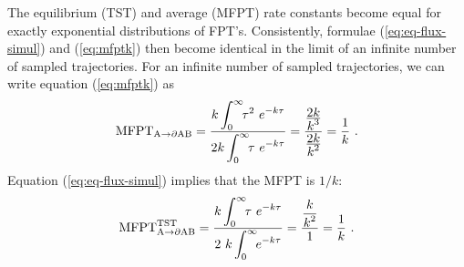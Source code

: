 The equilibrium (TST) and average (MFPT) rate constants become equal for exactly exponential distributions of FPT's.
Consistently, formulae (\ref{eq:eq-flux-simul}) and (\ref{eq:mfptk}) then become identical in the limit of an infinite number of sampled trajectories.
For an infinite number of sampled trajectories, we can write equation (\ref{eq:mfptk}) as 
\begin{equation}
\label{eq:mfptk-limit}
{\rm MFPT}_{\rm A \rightarrow \partial AB} 
=  \frac{\displaystyle k \int_0^{\infty} \!\!  \tau^2  ~ e^{-k \tau} }{\displaystyle 2 k \int_0^{\infty} \!\! \tau ~ e^{-k \tau}} 
= \frac{\frac{\displaystyle 2 k}{\displaystyle k^3}}{\frac{\displaystyle 2 k}{\displaystyle k^2}} = \frac{\displaystyle  1}{\displaystyle k} ~.
\end{equation}
Equation (\ref{eq:eq-flux-simul}) implies that the MFPT is $1 / k$:
\begin{equation}
\label{eq:eq-flux-limit}
{\rm MFPT}^{\rm TST}_{\rm A \rightarrow \partial AB} 
= \frac{\displaystyle k \int_0^{\infty} \!\! \tau ~ e^{-k \tau} }{\displaystyle 2 ~ k \int_0^{\infty} \!\! e^{-k \tau}} 
= \frac{\displaystyle \frac{\displaystyle k}{\displaystyle k^2}}{\displaystyle 1} = \displaystyle \frac{1}{ k} ~.
\end{equation}

